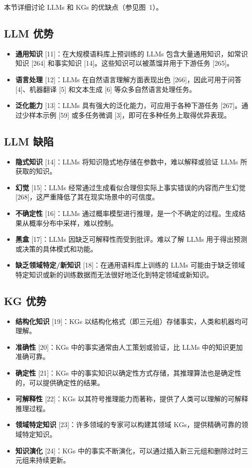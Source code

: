 \documentclass[11pt,UTF8,fontset=fandol]{ctexart}
\begin{document}
本节详细讨论 LLMs 和 KGs 的优缺点（参见图~1）。

\subsection*{LLM 优势}
\begin{itemize}
\item \textbf{通用知识} [11]：在大规模语料库上预训练的 LLMs 包含大量通用知识，如常识知识 [264] 和事实知识 [14]。这些知识可以被蒸馏并用于下游任务 [265]。
\item \textbf{语言处理} [12]：LLMs 在自然语言理解方面表现出色 [266]，因此可用于问答 [4]、机器翻译 [5] 和文本生成 [6] 等众多自然语言处理任务。
\item \textbf{泛化能力} [13]：LLMs 具有强大的泛化能力，可应用于各种下游任务 [267]。通过少样本示例 [59] 或多任务微调 [3]，即可在多种任务上取得优异表现。
\end{itemize}

\subsection*{LLM 缺陷}
\begin{itemize}
\item \textbf{隐式知识} [14]：LLMs 将知识隐式地存储在参数中，难以解释或验证 LLMs 所获取的知识。
\item \textbf{幻觉} [15]：LLMs 经常通过生成看似合理但实际上事实错误的内容而产生幻觉 [268]，这严重降低了其在现实场景中的可信度。
\item \textbf{不确定性} [16]：LLMs 通过概率模型进行推理，是一个不确定的过程。生成结果从概率分布中采样，难以控制。
\item \textbf{黑盒} [17]：LLMs 因缺乏可解释性而受到批评。难以了解 LLMs 用于得出预测或决策的具体模式和功能。
\item \textbf{缺乏领域特定/新知识} [18]：在通用语料库上训练的 LLMs 可能由于缺乏领域特定知识或新的训练数据而无法很好地泛化到特定领域或新知识。
\end{itemize}

\subsection*{KG 优势}
\begin{itemize}
\item \textbf{结构化知识} [19]：KGs 以结构化格式（即三元组）存储事实，人类和机器均可理解。
\item \textbf{准确性} [20]：KGs 中的事实通常由人工策划或验证，比 LLMs 中的知识更加准确可靠。
\item \textbf{确定性} [21]：KGs 中的事实知识以确定性方式存储，其推理算法也是确定性的，可以提供确定性的结果。
\item \textbf{可解释性} [22]：KGs 以其符号推理能力而著称，提供了人类可以理解的可解释推理过程。
\item \textbf{领域特定知识} [23]：许多领域的专家可以构建其领域 KGs，提供精确可靠的领域特定知识。
\item \textbf{知识演化} [24]：KGs 中的事实不断演化，可以通过插入新三元组和删除过时三元组来持续更新。
\end{itemize}
\end{document}
